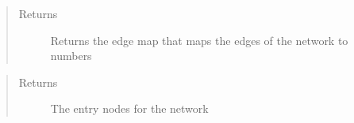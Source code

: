 \documentclass[letterpaper,10pt,english]{sphinxmanual}
\begin{document}
\begin{fulllineitems}
\begin{fulllineitems}
\begin{quote}
\begin{description}
\begin{description}
\end{description}


\end{description}\end{quote}

\end{fulllineitems}


\begin{fulllineitems}
\label{\detokenize{source/yawning_titan.envs.generic.core:yawning_titan.envs.generic.core.network_interface.NetworkInterface.get_edge_map}}\begin{quote}\begin{description}
\item[{Returns}] \leavevmode
\sphinxAtStartPar
Returns the edge map that maps the edges of the network to numbers

\end{description}\end{quote}

\end{fulllineitems}


\begin{fulllineitems}
\label{\detokenize{source/yawning_titan.envs.generic.core:yawning_titan.envs.generic.core.network_interface.NetworkInterface.get_entry_nodes}}\begin{quote}\begin{description}
\item[{Returns}] \leavevmode
\sphinxAtStartPar
The entry nodes for the network

\end{description}\end{quote}

\end{fulllineitems}


\end{fulllineitems}
\end{document}
